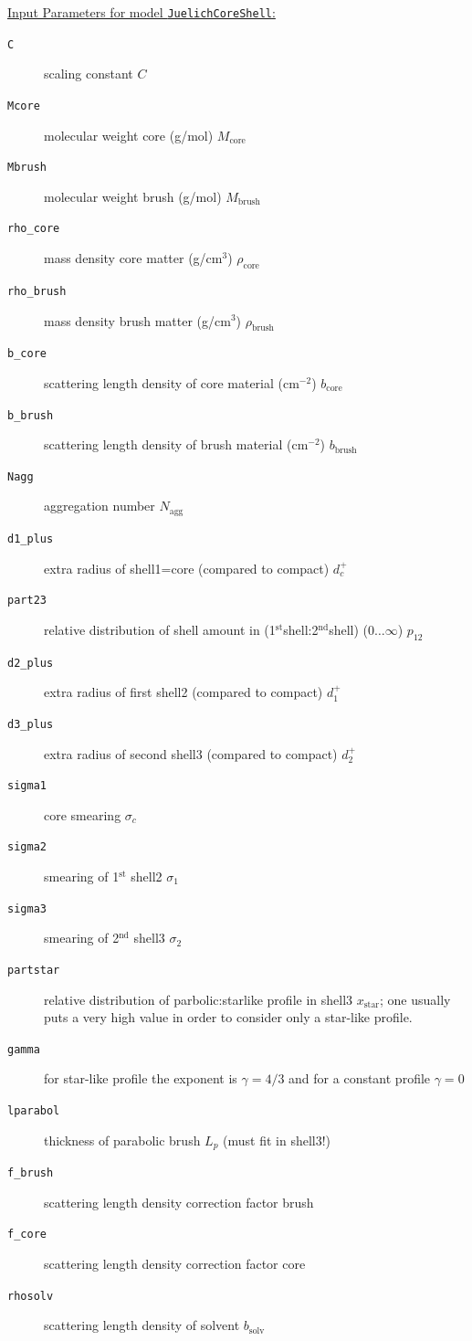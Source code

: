 \vspace{5mm}
\noindent \underline{Input Parameters for model \texttt{JuelichCoreShell}:}
\begin{description}
\item[\texttt{C}] scaling constant $C$
\item[\texttt{Mcore}] molecular weight core (g/mol) $M_\text{core}$
\item[\texttt{Mbrush}] molecular weight brush (g/mol) $M_\text{brush}$
\item[\texttt{rho\_core}] mass density core matter (g/cm$^3$) $\rho_\text{core}$
\item[\texttt{rho\_brush}] mass density brush matter (g/cm$^3$) $\rho_\text{brush}$
\item[\texttt{b\_core}] scattering length density of core material (cm$^{-2}$) $b_\text{core}$
\item[\texttt{b\_brush}] scattering length density of brush material (cm$^{-2}$) $b_\text{brush}$
\item[\texttt{Nagg}] aggregation number $N_\text{agg}$
\item[\texttt{d1\_plus}] extra radius of shell1=core (compared to compact) $d_c^+$
\item[\texttt{part23}] relative distribution of shell amount in
                (1$^\text{st}$shell:2$^\text{nd}$shell) ($0\ldots\infty$) $p_{12}$
\item[\texttt{d2\_plus}] extra radius of first shell2 (compared to compact) $d_1^+$
\item[\texttt{d3\_plus}] extra radius of second shell3 (compared to compact) $d_2^+$
\item[\texttt{sigma1}] core smearing $\sigma_c$
\item[\texttt{sigma2}] smearing of 1$^\text{st}$ shell2 $\sigma_1$
\item[\texttt{sigma3}] smearing of 2$^\text{nd}$ shell3 $\sigma_2$
\item[\texttt{partstar}] relative distribution of parbolic:starlike profile in shell3 $x_\text{star}$;
        one usually puts a very high value in order to consider only a star-like profile.
\item[\texttt{gamma}] for star-like profile the exponent is $\gamma=4/3$ and
    for a constant profile $\gamma=0$
\item[\texttt{lparabol}] thickness of parabolic brush $L_p$ (must fit in shell3!)
\item[\texttt{f\_brush}] scattering length density correction factor brush
\item[\texttt{f\_core}] scattering length density correction factor core
\item[\texttt{rhosolv}] scattering length density of solvent $b_\textrm{solv}$
\end{description}

